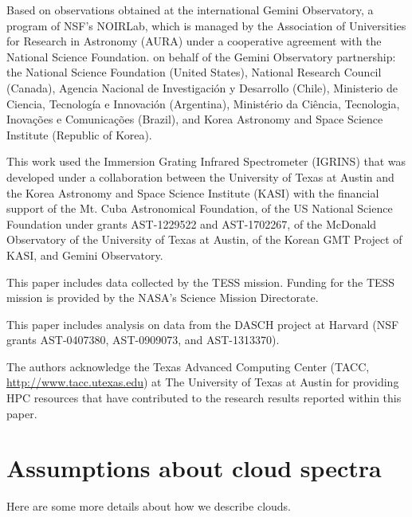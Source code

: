 \documentclass[modern]{aastex631}
\begin{document}
\begin{acknowledgements}
Based on observations obtained at the international Gemini Observatory, a program of NSF’s NOIRLab, which is managed by the Association of Universities for Research in Astronomy (AURA) under a cooperative agreement with the National Science Foundation. on behalf of the Gemini Observatory partnership: the National Science Foundation (United States), National Research Council (Canada), Agencia Nacional de Investigaci\'{o}n y Desarrollo (Chile), Ministerio de Ciencia, Tecnolog\'{i}a e Innovaci\'{o}n (Argentina), Minist\'{e}rio da Ci\^{e}ncia, Tecnologia, Inova\c{c}\~{o}es e Comunica\c{c}\~{o}es (Brazil), and Korea Astronomy and Space Science Institute (Republic of Korea).

This work used the Immersion Grating Infrared Spectrometer (IGRINS) that was developed under a collaboration between the University of Texas at Austin and the Korea Astronomy and Space Science Institute (KASI) with the financial support of the Mt. Cuba Astronomical Foundation, of the US National Science Foundation under grants AST-1229522 and AST-1702267, of the McDonald Observatory of the University of Texas at Austin, of the Korean GMT Project of KASI, and Gemini Observatory.

This paper includes data collected by the TESS mission. Funding for the TESS mission is provided by the NASA's Science Mission Directorate.

This paper includes analysis on data from the DASCH project at Harvard (NSF grants AST-0407380, AST-0909073, and AST-1313370).

The authors acknowledge the Texas Advanced Computing Center (TACC, \url{http://www.tacc.utexas.edu}) at The University of Texas at Austin for providing HPC resources that have contributed to the research results reported within this paper.
\end{acknowledgements}

\clearpage








\clearpage

\appendix
\restartappendixnumbering

\section{Assumptions about cloud spectra} \label{appendix:clouds}

Here are some more details about how we describe clouds.
\end{document}
